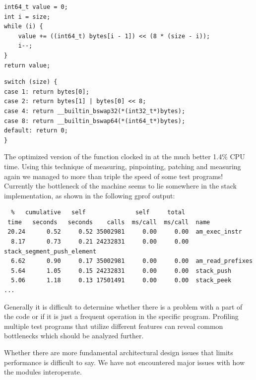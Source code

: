 \begin{minipage}{\linewidth}
\begin{lstlisting}[language={[ANSI]C},%
  caption={The function \code{bytes2int} before optimization.},%
  label={lst:eval:gprof-pre}]
int64_t value = 0;
int i = size;
while (i) {
    value += ((int64_t) bytes[i - 1]) << (8 * (size - i));
    i--;
}
return value;
\end{lstlisting}

\begin{lstlisting}[language={[ANSI]C},%
  caption={The function \code{bytes2int} after optimization},%
  label={lst:eval:gprof-post}]
switch (size) {
case 1: return bytes[0];
case 2: return bytes[1] | bytes[0] << 8;
case 4: return __builtin_bswap32(*(int32_t*)bytes);
case 8: return __builtin_bswap64(*(int64_t*)bytes);
default: return 0;
}
\end{lstlisting}
\end{minipage}

The optimized version of the function clocked in at the much better 1.4\% CPU
time. Using this technique of measuring, pinpointing, patching and measuring
again we managed to more than triple the speed of some test programs! Currently
the bottleneck of the machine seems to lie somewhere in the stack
implementation, as shown in the following gprof output:

\begin{verbatim}
  %   cumulative   self              self     total
 time   seconds   seconds    calls  ms/call  ms/call  name
 20.24      0.52     0.52 35002981     0.00     0.00  am_exec_instr
  8.17      0.73     0.21 24232831     0.00     0.00  stack_segment_push_element
  6.62      0.90     0.17 35002981     0.00     0.00  am_read_prefixes
  5.64      1.05     0.15 24232831     0.00     0.00  stack_push
  5.06      1.18     0.13 17501491     0.00     0.00  stack_peek
...
\end{verbatim}

Generally it is difficult to determine whether there is a problem with a part of
the code or if it is just a frequent operation in the specific
program. Profiling multiple test programs that utilize different features can
reveal common bottlenecks which should be analyzed further.

Whether there are more fundamental architectural design issues that limits
performance is difficult to say. We have not encountered major issues with how
the modules interoperate.


